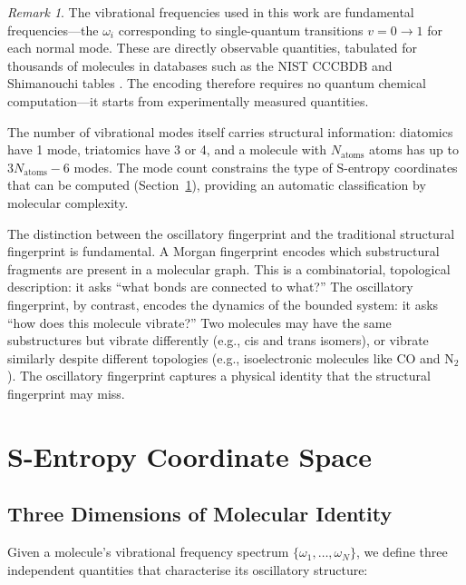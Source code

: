 \documentclass[11pt,twocolumn,a4paper]{article}
\theoremstyle{definition}
\theoremstyle{remark}
\newtheorem{remark}[theorem]{Remark}
\begin{document}
\begin{remark}
The vibrational frequencies used in this work are fundamental frequencies---the $\omega_i$ corresponding to single-quantum transitions $v = 0 \to 1$ for each normal mode. These are directly observable quantities, tabulated for thousands of molecules in databases such as the NIST CCCBDB \citep{johnson2022} and Shimanouchi tables \citep{shimanouchi1972}. The encoding therefore requires no quantum chemical computation---it starts from experimentally measured quantities.
\end{remark}

The number of vibrational modes itself carries structural information: diatomics have 1 mode, triatomics have 3 or 4, and a molecule with $N_{\mathrm{atoms}}$ atoms has up to $3N_{\mathrm{atoms}} - 6$ modes. The mode count constrains the type of S-entropy coordinates that can be computed (Section~\ref{sec:s_entropy}), providing an automatic classification by molecular complexity.

The distinction between the oscillatory fingerprint and the traditional structural fingerprint is fundamental. A Morgan fingerprint \citep{rogers2010} encodes which substructural fragments are present in a molecular graph. This is a combinatorial, topological description: it asks ``what bonds are connected to what?'' The oscillatory fingerprint, by contrast, encodes the dynamics of the bounded system: it asks ``how does this molecule vibrate?'' Two molecules may have the same substructures but vibrate differently (e.g., cis and trans isomers), or vibrate similarly despite different topologies (e.g., isoelectronic molecules like CO and N$_2$). The oscillatory fingerprint captures a physical identity that the structural fingerprint may miss.

\section{S-Entropy Coordinate Space}
\label{sec:s_entropy}

\subsection{Three Dimensions of Molecular Identity}

Given a molecule's vibrational frequency spectrum $\{\omega_1, \ldots, \omega_N\}$, we define three independent quantities that characterise its oscillatory structure:
\end{document}
